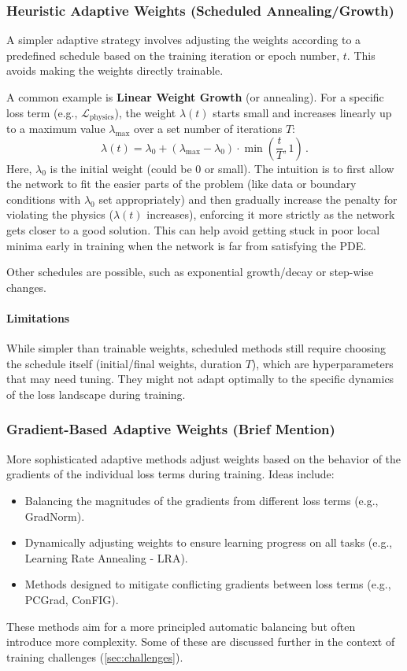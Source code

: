 \subsubsection{Heuristic Adaptive Weights (Scheduled Annealing/Growth)}

A simpler adaptive strategy involves adjusting the weights according to a predefined schedule based on the training iteration or epoch number, $t$. This avoids making the weights directly trainable.

A common example is \textbf{Linear Weight Growth} (or annealing). For a specific loss term (e.g., $\mathcal{L}_{\text{physics}}$), the weight $\lambda(t)$ starts small and increases linearly up to a maximum value $\lambda_{\text{max}}$ over a set number of iterations $T$:
%
\begin{equation*} 
\lambda(t) = \lambda_0 + (\lambda_{\text{max}} - \lambda_0) \cdot \min\left( \frac{t}{T}, 1 \right)\,. 
\end{equation*} 
%
Here, $\lambda_0$ is the initial weight (could be 0 or small). The intuition is to first allow the network to fit the easier parts of the problem (like data or boundary conditions with $\lambda_0$ set appropriately) and then gradually increase the penalty for violating the physics ($\lambda(t)$ increases), enforcing it more strictly as the network gets closer to a good solution. This can help avoid getting stuck in poor local minima early in training when the network is far from satisfying the PDE.

Other schedules are possible, such as exponential growth/decay or step-wise changes.

\paragraph{Limitations}
While simpler than trainable weights, scheduled methods still require choosing the schedule itself (initial/final weights, duration $T$), which are hyperparameters that may need tuning. They might not adapt optimally to the specific dynamics of the loss landscape during training.

\subsubsection{Gradient-Based Adaptive Weights (Brief Mention)}
More sophisticated adaptive methods adjust weights based on the behavior of the gradients of the individual loss terms during training. Ideas include:
\begin{itemize}
    \item Balancing the magnitudes of the gradients from different loss terms (e.g., GradNorm).
    \item Dynamically adjusting weights to ensure learning progress on all tasks (e.g., Learning Rate Annealing - LRA).
    \item Methods designed to mitigate conflicting gradients between loss terms (e.g., PCGrad, ConFIG).
\end{itemize}
These methods aim for a more principled automatic balancing but often introduce more complexity. Some of these are discussed further in the context of training challenges (\cref{sec:challenges}).

